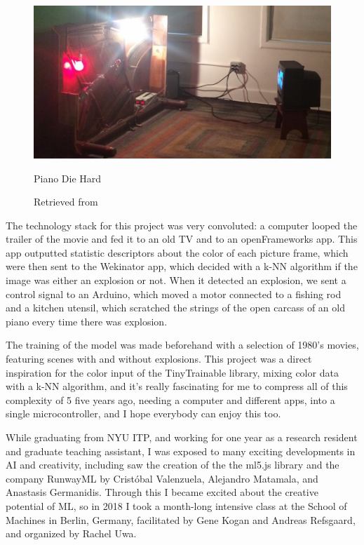 \begin{figure}[ht]
  \centering
  \includegraphics[width=0.80\linewidth,height=0.40\textheight,keepaspectratio]{images/piano-die-hard.jpg}
  \caption{Piano Die Hard}
  \caption*{Retrieved from \cite{website-alt-ai}}
  \label{fig:piano-die-hard}
\end{figure}

The technology stack for this project was very convoluted: a computer looped the trailer of the movie and fed it to an old TV and to an openFrameworks app. This app outputted statistic descriptors about the color of each picture frame, which were then sent to the Wekinator app, which decided with a \acrshort{k-NN} algorithm if the image was either an explosion or not. When it detected an explosion, we sent a control signal to an Arduino, which moved a motor connected to a fishing rod and a kitchen utensil, which scratched the strings of the open carcass of an old piano every time there was explosion.

The training of the model was made beforehand with a selection of 1980's movies, featuring scenes with and without explosions. This project was a direct inspiration for the color input of the TinyTrainable library, mixing color data with a \acrshort{k-NN} algorithm, and it's really fascinating for me to compress all of this complexity of 5 five years ago, needing a computer and different apps, into a single microcontroller, and I hope everybody can enjoy this too.

While graduating from \acrshort{NYU} \acrshort{ITP}, and working for one year as a research resident and graduate teaching assistant, I was exposed to many exciting developments in \acrshort{AI} and creativity, including saw the creation of the the ml5.js library and the company RunwayML by Cristóbal Valenzuela, Alejandro Matamala, and Anastasis Germanidis. Through this I became excited about the creative potential of \acrshort{ML}, so in 2018 I took a month-long intensive class at the School of Machines in Berlin, Germany, facilitated by Gene Kogan and Andreas Refsgaard, and organized by Rachel Uwa.

